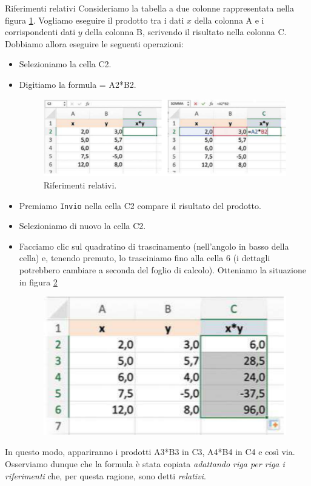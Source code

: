 \documentclass[12pt,a4paper,oneside]{book}
\makeatletter
\renewcommand{\subsubsection}{\@startsection {subsubsection}{3}{\z@}
{-2ex \@plus -0.1ex \@minus -.2ex}
{.2ex \@plus.2ex }
{\color[rgb]{0.141,0.596,0.749}\normalfont\small\sffamily\bfseries}}
\theoremstyle{esercizio}
\makeatother
\begin{document}
\subsubsection{Riferimenti relativi}
Consideriamo la tabella a due colonne rappresentata nella figura \ref{fig:rifrel}. Vogliamo
eseguire il prodotto tra i dati $x$ della colonna A e i corrispondenti dati $y$ della 
colonna B, scrivendo il risultato nella colonna C. Dobbiamo allora eseguire le
seguenti operazioni:
\begin{itemize}
    \item Selezioniamo la cella C2.
    \item Digitiamo la formula = A2*B2.
    \begin{figure}[h!]
        \centering
        \includegraphics[scale=0.4]{path_to_image/riferimenti-relativi.png} 
        \caption{Riferimenti relativi.}
        \label{fig:rifrel}
    \end{figure}
    \item Premiamo \texttt{Invio} nella cella C2 compare il risultato del prodotto.
    \item Selezioniamo di nuovo la cella C2.
    \item Facciamo clic sul quadratino di trascinamento (nell'angolo in basso della cella) e,
    tenendo premuto, lo trasciniamo fino alla cella 6 (i dettagli potrebbero cambiare
    a seconda del foglio di calcolo). Otteniamo la situazione in figura \ref{fig:copyform}
    \begin{figure}[h!]
        \centering
        \includegraphics[scale=0.4]{path_to_image/copia-formula.png} 
        \caption{}
        \label{fig:copyform}
    \end{figure} 
\end{itemize}
In questo modo, appariranno i prodotti A3*B3 in C3, A4*B4 in C4 e così via. 
Osserviamo dunque che la formula è stata copiata \textit{adattando riga per riga i riferimenti} che, per questa
ragione, sono detti \textit{relativi}.
\end{document}

